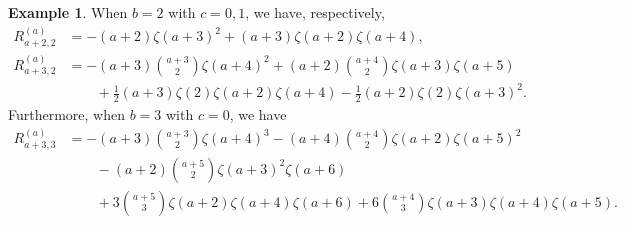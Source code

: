 \documentclass[12pt]{amsart}%
\theoremstyle{definition}
\newtheorem{prop}[theorem]{Proposition}
\newtheorem{example}[theorem]{Example}
\begin{document}
\begin{example}
When $b=2$ with $c=0,1$, 
we have, respectively,  
\begin{align*}
R_{a+2,2}^{(a)}
&=-(a+2)\zeta(a+3)^2+(a+3)\zeta(a+2)\zeta(a+4),\\
R^{(a)}_{a+3,2}
&=-(a+3)\binom{a+3}{2}\zeta(a+4)^2
+(a+2)\binom{a+4}{2}\zeta(a+3)\zeta(a+5)\\
&\qquad +\frac{1}{2}(a+3)\zeta(2)\zeta(a+2)\zeta(a+4)
-\frac{1}{2}(a+2)\zeta(2)\zeta(a+3)^2.
\end{align*}
Furthermore, 
when $b=3$ with $c=0$, we have 
\begin{align*}
R_{a+3,3}^{(a)}
&=-(a+3)\binom{a+3}{2}\zeta(a+4)^3
-(a+4)\binom{a+4}{2}\zeta(a+2)\zeta(a+5)^2\\
&\qquad -(a+2)\binom{a+5}{2}\zeta(a+3)^2\zeta(a+6)\\
&\qquad +3\binom{a+5}{3}\zeta(a+2)\zeta(a+4)\zeta(a+6)
+6\binom{a+4}{3}\zeta(a+3)\zeta(a+4)\zeta(a+5).
\end{align*}
\end{example}

\end{document}
